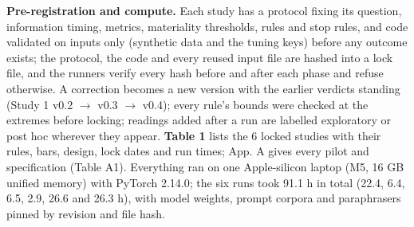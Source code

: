 \documentclass[11pt,letterpaper]{article}
\begin{document}
\textbf{Pre-registration and compute.} Each study has a protocol fixing its question, information timing, metrics, materiality thresholds, rules and stop rules, and code validated on inputs only (synthetic data and the tuning keys) before any outcome exists; the protocol, the code and every reused input file are hashed into a lock file, and the runners verify every hash before and after each phase and refuse otherwise. A correction becomes a new version with the earlier verdicts standing (Study 1 v0.2 \ensuremath{\rightarrow} v0.3 \ensuremath{\rightarrow} v0.4); every rule's bounds were checked at the extremes before locking; readings added after a run are labelled exploratory or post hoc wherever they appear. \textbf{Table 1} lists the 6 locked studies with their rules, bars, design, lock dates and run times; App. A gives every pilot and specification (Table A1). Everything ran on one Apple-silicon laptop (M5, 16 GB unified memory) with PyTorch 2.14.0; the six runs took 91.1 h in total (22.4, 6.4, 6.5, 2.9, 26.6 and 26.3 h), with model weights, prompt corpora and paraphrasers pinned by revision and file hash.
\end{document}
